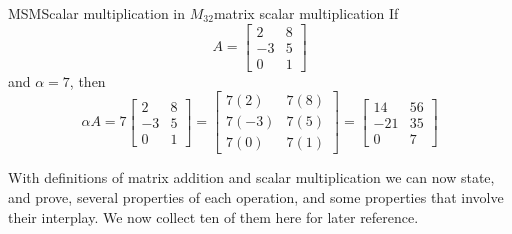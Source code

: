 \begin{example}{MSM}{Scalar multiplication in $M_{32}$}{matrix scalar multiplication}
If
%
\begin{equation*}
A=
\begin{bmatrix}
2&8\\
-3&5\\0&1
\end{bmatrix}
\end{equation*}
%
and $\alpha=7$, then
%
\begin{equation*}
\alpha A=
7\begin{bmatrix}2&8\\-3&5\\0&1\end{bmatrix}=
\begin{bmatrix}7(2)&7(8)\\7(-3)&7(5)\\7(0)&7(1)\end{bmatrix}=
\begin{bmatrix}14&56\\-21&35\\0&7\end{bmatrix}
\end{equation*}
%
\end{example}
%
%
%
With definitions of matrix addition and scalar multiplication we can now state, and prove, several properties of each operation, and some properties that involve their interplay.  We now collect ten of them here for later reference.
%
%
